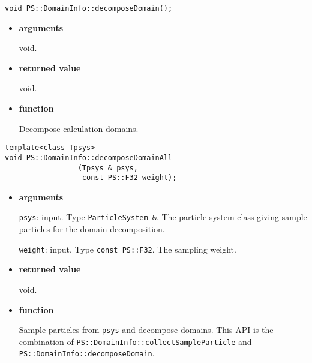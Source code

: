 
\begin{screen}
\begin{verbatim}
void PS::DomainInfo::decomposeDomain();
\end{verbatim}
\end{screen}

\begin{itemize}

\item {\bf arguments}

void.

\item {\bf returned value}

void.

\item {\bf function}

Decompose calculation domains.

\end{itemize}


\begin{screen}
\begin{verbatim}
template<class Tpsys>
void PS::DomainInfo::decomposeDomainAll
                 (Tpsys & psys,
                  const PS::F32 weight);
\end{verbatim}
\end{screen}

\begin{itemize}

\item {\bf arguments}

\texttt{psys}: input. Type {\tt ParticleSystem \&}. The particle system class
giving sample particles for the domain decomposition.

\texttt{weight}: input. Type \texttt{const PS::F32}. The sampling weight.

\item {\bf returned value}

void.

\item {\bf function}

Sample particles from \texttt{psys} and decompose domains.  This API
is the combination of {\tt PS::DomainInfo::collectSampleParticle} and
{\tt PS::DomainInfo::decomposeDomain}.


\end{itemize}

